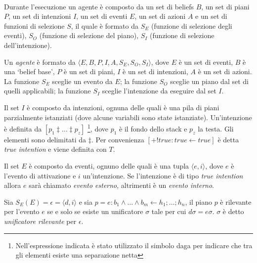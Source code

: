 \paragraph*{}
Durante l'esecuzione un agente è composto da un set di beliefs $B$, un set di piani $P$, un set di intenzioni $I$, un set di eventi $E$, un set di azioni $A$ e un set di funzioni di selezione $S$, il quale è formato da $S_E$ (funzione di selezione degli eventi), $S_O$ (funzione di selezione del piano), $S_I$ (funzione di selezione dell'intenzione).

\smallskip
\begin{defn}
Un \textit{agente} è formato da $\langle E,B,P,I,A,S_E,S_O,S_I \rangle$, dove $E$ è un set di eventi, $B$ è una `belief base', $P$ è un set di piani, $I$ è un set di intenzioni, $A$ è un set di azioni. La funzione $S_E$ sceglie un evento da $E$; la funzione $S_O$ sceglie un piano dal set di quelli applicabili; la funzione $S_I$ sceglie l'intenzione da eseguire dal set $I$.
\end{defn}

\smallskip
\begin{defn}
Il set $I$ è composto da intenzioni, ognuna delle quali è una pila di piani parzialmente istanziati (dove alcune variabili sono state istanziate). Un'intenzione è definita da $[p_1 \ddagger \ldots \ddagger p_z]$ \footnote{Nell'espressione indicata è stato utilizzato il simbolo daga per indicare che tra gli elementi esiste una separazione netta}, dove $p_1$ è il fondo dello stack e $p_z$ la testa. Gli elementi sono delimitati da $\ddagger$. Per convenienza $[+!true : true \leftarrow true]$ è detta \textit{true intention} e viene definita con $T$.
\end{defn}

\smallskip
\begin{defn}
Il set $E$ è composto da eventi, ognuno delle quali è una tupla $\langle e, i \rangle$, dove $e$ è l'evento di attivazione e $i$ un'intenzione. Se l'intenzione è di tipo \textit{true intention} allora $e$ sarà chiamato \textit{evento esterno}, altrimenti è un \textit{evento interno}.
\end{defn}

\smallskip
\begin{defn}
Sia $S_E(E) = \epsilon = \langle d, i \rangle$ e sia $p = e : b_1 \land \ldots \land b_m \leftarrow h_1; \ldots; h_n$, il piano $p$ è rilevante per l'evento $e$ se e solo se esiste un unificatore $\sigma$ tale per cui $d\sigma = e\sigma$.
$\sigma$ è detto \textit{unificatore rilevante} per $\epsilon$.
\end{defn}

